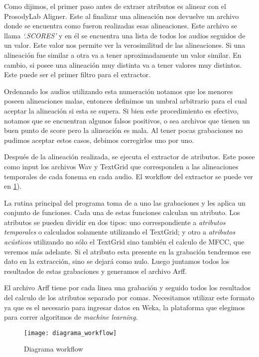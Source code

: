 Como dijimos, el primer paso antes de extraer atributos es alinear con el ProsodyLab Aligner. Este al finalizar una alineación nos devuelve un archivo donde se encuentra como fueron realizadas esas alineaciones. Este archivo se llama \textit{`.SCORES’} y en él se encuentra una lista de todos los audios seguidos de un valor. Este valor nos permite ver la verosimilitud de las alineaciones. Si una alineación fue similar a otra va a tener aproximadamente un valor similar. En cambio, si posee una alineación muy distinta va a tener valores muy distintos. Este puede ser el primer filtro para el extractor.

Ordenando los audios utilizando esta numeración notamos que los menores poseen alineaciones malas, entonces definimos un umbral arbitrario para el cual aceptar la alineación si esta se supera. Si bien este procedimiento es efectivo, notamos que se encuentran algunos falsos positivos, o sea archivos que tienen un buen punto de score pero la alineación es mala. Al tener pocas grabaciones no pudimos aceptar estos casos, debimos corregirlos uno por uno.

Después de la alineación realizada, se ejecuta el extractor de atributos. Este posee como input los archivos Wav y TextGrid que corresponden a las alineaciones temporales de cada fonema en cada audio. El workflow del extractor se puede ver en \ref{workflow}). 

La rutina principal del programa toma de a uno las grabaciones y les aplica un conjunto de funciones. Cada una de estas funciones calculan un atributo. Los atributos se pueden dividir en dos tipos: uno correspondiente a \textit{atributos temporales} o calculados solamente utilizando el TextGrid; y otro a \textit{atributos acústicos} utilizando no sólo el TextGrid sino también el calculo de MFCC, que veremos más adelante. Si el atributo esta presente en la grabación tendremos ese dato en la extracción, sino se dejará como nulo. Luego juntamos todos los resultados de estas grabaciones y generamos el archivo Arff.

El archivo Arff  tiene por cada linea una grabación y seguido todos los resultados del calculo de los atributos separado por comas. Necesitamos utilizar este formato ya que es el necesario para ingresar datos en Weka, la plataforma que elegimos para correr algoritmos de \textit{machine learning}.

\begin{figure}[h!]
    \centerline{\texttt{[image: diagrama\_workflow]} }
    \caption{Diagrama workflow}
    \label{workflow}
\end{figure}

